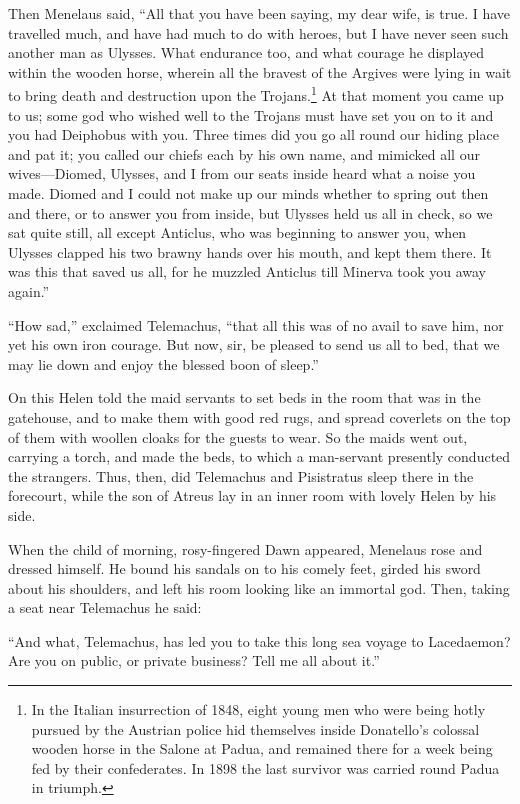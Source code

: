 Then Menelaus said, “All that you have been saying, my dear wife, is true. I
have travelled much, and have had much to do with heroes, but I have never seen
such another man as Ulysses. What endurance too, and what courage he displayed
within the wooden horse, wherein all the bravest of the Argives were lying in
wait to bring death and destruction upon the Trojans.\footnote{In the Italian insurrection of 1848, eight young men who were being hotly
pursued by the Austrian police hid themselves inside Donatello’s colossal
wooden horse in the Salone at Padua, and remained there for a week being fed
by their confederates. In 1898 the last survivor was carried round Padua in
triumph.} At that moment you came up to us;
some god who wished well to the Trojans must have set you on to it and you had
Deiphobus with you. Three times did you go all round our hiding place and pat
it; you called our chiefs each by his own name, and mimicked all our
wives—Diomed, Ulysses, and I from our seats inside heard what a noise you made.
Diomed and I could not make up our minds whether to spring out then and there,
or to answer you from inside, but Ulysses held us all in check, so we sat quite
still, all except Anticlus, who was beginning to answer you, when Ulysses
clapped his two brawny hands over his mouth, and kept them there. It was this
that saved us all, for he muzzled Anticlus till Minerva took you away again.”

“How sad,” exclaimed Telemachus, “that all this was of no avail to save him,
nor yet his own iron courage. But now, sir, be pleased to send us all to bed,
that we may lie down and enjoy the blessed boon of sleep.”

On this Helen told the maid servants to set beds in the room that was in the
gatehouse, and to make them with good red rugs, and spread coverlets on the top
of them with woollen cloaks for the guests to wear. So the maids went out,
carrying a torch, and made the beds, to which a man-servant presently conducted
the strangers. Thus, then, did Telemachus and Pisistratus sleep there in the
forecourt, while the son of Atreus lay in an inner room with lovely Helen by
his side.

When the child of morning, rosy-fingered Dawn appeared, Menelaus rose and
dressed himself. He bound his sandals on to his comely feet, girded his sword
about his shoulders, and left his room looking like an immortal god. Then,
taking a seat near Telemachus he said:

“And what, Telemachus, has led you to take this long sea voyage to Lacedaemon?
Are you on public, or private business? Tell me all about it.”

